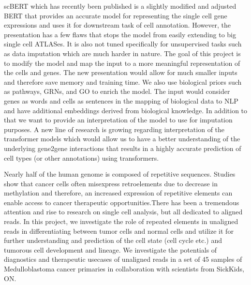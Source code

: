 \documentclass[10pt,letterpaper]{moderncv}
\begin{document}
{}{scBERT which has recently been published is a slightly modified and adjusted BERT that provides an accurate model for representing the single cell gene expressions and uses it for downstream task of cell annotation. However, the presentation has a few flaws that stops the model from easily extending to big single cell ATLASes. It is also not tuned specifically for unsupervised tasks such as data imputation which are much harder in nature. The goal of this project is to modify the model and map the input to a more meaningful representation of the cells and genes. The new presentation would allow for much smaller inputs and therefore save memory and training time. We also use biological priors such as pathways, GRNs, and GO to enrich the model. The input would consider genes as words and cells as sentences in the mapping of biological data to NLP and have additional embeddings derived from biological knowledge. In addition to that we want to provide an interpretation of the model to use for imputation purposes. A new line of research is growing regarding interpretation of the transformer models which would allow us to have a better understanding of the underlying gene2gene interactions that results in a highly accurate prediction of cell types (or other annotations) using transformers.}

{}{Nearly half of the human genome is composed of repetitive sequences. Studies show that cancer cells often misexpress retroelements due to decrease in methylation and therefore, an increased expression of repetitive elements can enable access to cancer therapeutic opportunities.There has been a tremendous attention and rise to research on single cell analysis, but all dedicated to aligned reads. In this project, we investigate the role of repeated elements in unaligned reads in differentiating between tumor cells and normal cells and utilize it for further understanding and prediction of the cell state (cell cycle etc.) and tumorous cell development and lineage. We investigate the potentials of diagnostics and therapeutic usecases of unaligned reads in a set of 45 samples of Medulloblastoma cancer primaries in collaboration with scientists from SickKids, ON.}
\end{document}
